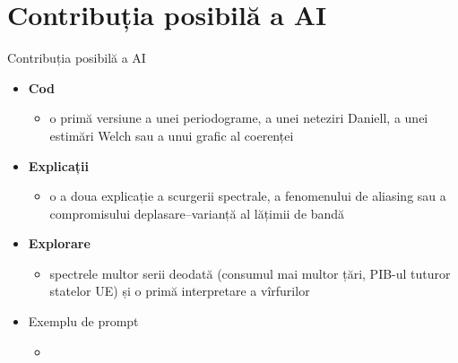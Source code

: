 \section{Contribuția posibilă a AI}

\begin{frame}{Contribuția posibilă a AI}
\itemsize{\small}
\begin{itemize}
    \item \textbf{Cod}
    \begin{itemize}
        \item o primă versiune a unei periodograme, a unei neteziri Daniell, a unei estimări Welch sau a unui grafic al coerenței
    \end{itemize}
    \item \textbf{Explicații}
    \begin{itemize}
        \item o a doua explicație a scurgerii spectrale, a fenomenului de aliasing sau a compromisului deplasare--varianță al lățimii de bandă
    \end{itemize}
    \item \textbf{Explorare}
    \begin{itemize}
        \item spectrele multor serii deodată (consumul mai multor țări, PIB-ul tuturor statelor UE) și o primă interpretare a vîrfurilor
    \end{itemize}
    \item Exemplu de prompt
    \begin{itemize}
        \item {}
    \end{itemize}
\end{itemize}
\end{frame}

